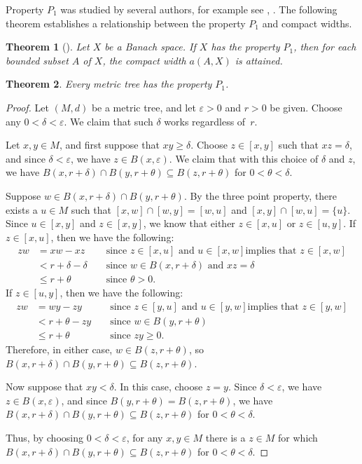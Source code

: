 \documentclass{bcp92}
\theoremstyle{plain}
\newtheorem{thm}{Theorem}[section]
\theoremstyle{definition}
\begin{document}
Property $P_1$  was studied by several authors, for example see \cite{Amir},
\cite{March}.  The following theorem establishes a relationship between the
property $P_1$ and compact widths.

\begin{thm} [\cite{kamal}] \label{P1}
Let $X$ be a Banach space. If $X$ has the property $P_1$, then for each
bounded subset $A$ of $X$, the compact width $a(A,X)$ is attained.
\end{thm}

\begin{thm} \label{tree-P1}
Every metric tree has the property $P_1$.
\end{thm}

\begin{proof}
Let $(M,d)$ be a metric tree, and let $\varepsilon > 0$ and $r > 0$ be given.
Choose any $0 < \delta < \varepsilon$. We claim that such
$\delta$ works regardless of~$r$.

Let $x,y \in M$, and first suppose that $xy \geq \delta$. Choose $z \in
[x,y]$ such that $xz = \delta$, and since $\delta < \varepsilon$, we have $z
\in B(x,\varepsilon)$. We claim that with this choice of $\delta$ and $z$, we
have $B(x,r+\delta) \cap B(y,r+\theta) \subseteq B(z,r+\theta)$ for $0 <
\theta < \delta$.

Suppose $w \in B(x,r+\delta) \cap B(y,r+\theta)$. By the three point
property, there exists a $u \in M$ such that $[x,w] \cap [w,y] = [w,u]$ and
$[x,y] \cap [w,u] = \{ u \}$. Since $u \in [x,y]$ and $z \in [x,y]$, we know
that either $z \in [x,u]$ or $z \in [u,y]$. If $z \in [x,u]$, then we have
the following:
$$
\begin{aligned}
zw &= xw - xz &&\text{ since } z \in [x,u] \text{ and } u \in [x,w] \text{
implies that } z \in [x,w] \\
&< r + \delta - \delta &&\text{ since } w \in B(x,r+\delta) \text{ and }
xz = \delta \\
&\leq r + \theta &&\text{ since } \theta > 0.
\end{aligned}
$$
If $z \in [u,y]$, then we have the following:
$$
\begin{aligned}
zw &= wy - zy &&\text{ since } z \in [y,u] \text{ and } u \in [y,w] \text{
implies that } z \in [y,w] \\
&< r + \theta - zy &&\text{ since } w \in B(y,r+\theta) \\
&\leq r + \theta &&\text{ since } zy \geq 0.
\end{aligned}
$$
Therefore, in either case, $w \in B(z,r+\theta)$, so $B(x,r+\delta) \cap
B(y,r+\theta) \subseteq B(z,r+\theta)$.

Now suppose that $xy < \delta$. In this case, choose $z = y$. Since $\delta <
\varepsilon$, we have $z \in B(x,\varepsilon)$, and since $B(y,r+\theta) =
B(z,r+\theta)$, we have $B(x,r+\delta) \cap B(y,r+\theta) \subseteq
B(z,r+\theta)$ for $0 < \theta < \delta$.

Thus, by choosing $0<\delta < \varepsilon $, for any $x,y \in M$
there is a $z \in M$ for which $B(x,r+\delta) \cap B(y,r+\theta) \subseteq
B(z,r+\theta)$ for $0 < \theta < \delta$.
\end{proof}
\end{document}
